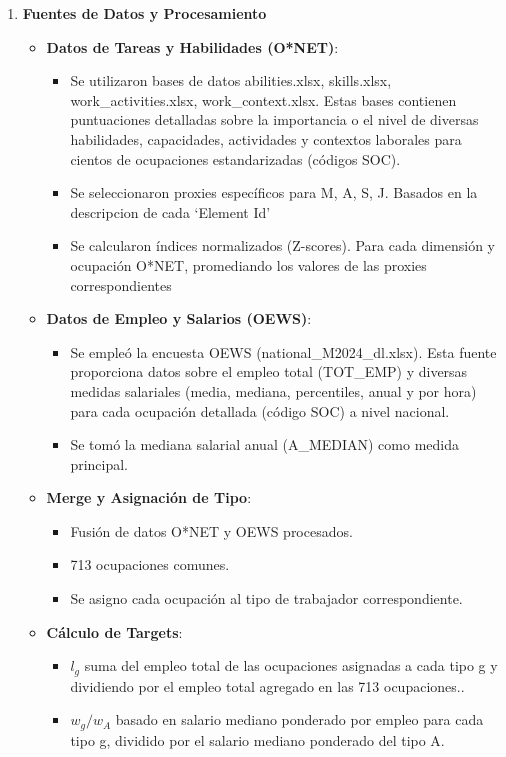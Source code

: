 \documentclass{article}
\theoremstyle{remark}
\theoremstyle{definition}
\begin{document}
\begin{enumerate}
\begin{tcolorbox}[title= Soluci\'on 6]
\begin{enumerate}
    \item \textbf{Fuentes de Datos y Procesamiento}
    \begin{itemize}
        \item \textbf{Datos de Tareas y Habilidades (O*NET)}:
        \begin{itemize}
            \item Se utilizaron bases de datos abilities.xlsx, skills.xlsx, work\_activities.xlsx, work\_context.xlsx. Estas bases contienen puntuaciones detalladas sobre la importancia o el nivel de diversas habilidades, capacidades, actividades y contextos laborales para cientos de ocupaciones estandarizadas (códigos SOC). 
            \item Se seleccionaron proxies específicos para M, A, S, J. Basados en la descripcion de cada `Element Id'
            \item Se calcularon índices normalizados (Z-scores). Para cada dimensi\'on y ocupaci\'on O*NET, promediando los valores de las proxies correspondientes
        \end{itemize}

        \item \textbf{Datos de Empleo y Salarios (OEWS)}:
        \begin{itemize}
            \item Se empleó la encuesta OEWS (national\_M2024\_dl.xlsx). Esta fuente proporciona datos sobre el empleo total (TOT\_EMP) y diversas medidas salariales (media, mediana, percentiles, anual y por hora) para cada ocupación detallada (código SOC) a nivel nacional.
            \item Se tomó la mediana salarial anual (A\_MEDIAN) como medida principal.
        \end{itemize}

        \item \textbf{Merge y Asignación de Tipo}:
        \begin{itemize}
            \item Fusión de datos O*NET y OEWS procesados.
            \item 713 ocupaciones comunes.
            \item Se asigno cada ocupaci\'on al tipo de trabajador correspondiente.
        \end{itemize}

        \item \textbf{Cálculo de Targets}:
        \begin{itemize}
            \item $l_g$ suma del empleo total de las ocupaciones asignadas a cada tipo g y dividiendo por el empleo total agregado en las 713 ocupaciones..
            \item $w_g/w_A$ basado en salario mediano ponderado por empleo para cada tipo g, dividido por el salario mediano ponderado del tipo A.
        \end{itemize}


\end{itemize}
\end{enumerate}
\end{tcolorbox}
\end{enumerate}
\end{document}

